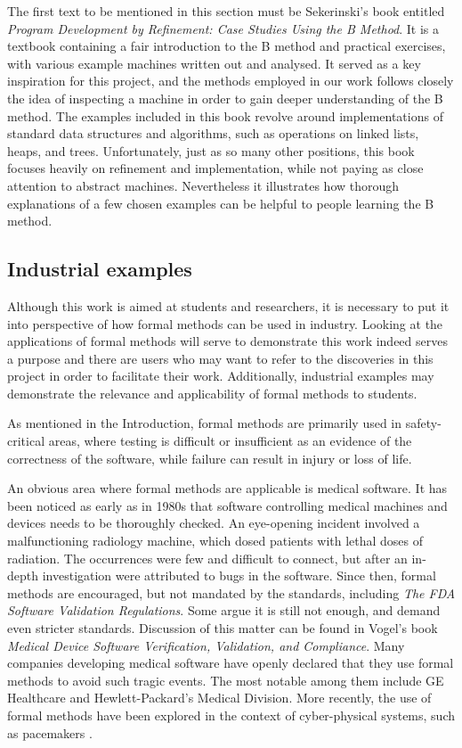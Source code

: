 \documentclass[12pt,journal,duplex]{IEEEtran}
\begin{document}
	The first text to be mentioned in this section must be Sekerinski's book entitled \emph{Program Development by Refinement: Case Studies Using the B Method}\cite{Sekerinski}. It is a textbook containing a fair introduction to the B method and practical exercises, with various example machines written out and analysed. It served as a key inspiration for this project, and the methods employed in our work follows closely the idea of inspecting a machine in order to gain deeper understanding of the B method. The examples included in this book revolve around implementations of standard data structures and algorithms, such as operations on linked lists, heaps, and trees. Unfortunately, just as so many other positions, this book focuses heavily on refinement and implementation, while not paying as close attention to abstract machines. Nevertheless it illustrates how thorough explanations of a few chosen examples can be helpful to people learning the B method.

	\subsection{Industrial examples}
	Although this work is aimed at students and researchers, it is necessary to put it into perspective of how formal methods can be used in industry. Looking at the applications of formal methods will serve to demonstrate this work indeed serves a purpose and there are users who may want to refer to the discoveries in this project in order to facilitate their work. Additionally, industrial examples may demonstrate the relevance and applicability of formal methods to students.

	As mentioned in the Introduction, formal methods are primarily used in safety-critical areas, where testing is difficult or insufficient as an evidence of the correctness of the software, while failure can result in injury or loss of life.

	An obvious area where formal methods are applicable is medical software. It has been noticed as early as in 1980s that software controlling medical machines and devices needs to be thoroughly checked. An eye-opening incident involved a malfunctioning radiology machine, which dosed patients with lethal doses of radiation. The occurrences were few and difficult to connect, but after an in-depth investigation were attributed to bugs in the software\cite{therac}. Since then, formal methods are encouraged, but not mandated by the standards, including \emph{The FDA Software Validation Regulations}\cite{FDA}. Some argue it is still not enough, and demand even stricter standards. Discussion of this matter can be found in Vogel's book \emph{Medical Device Software Verification, Validation, and Compliance}\cite{vogel}. Many companies developing medical software have openly declared that they use formal methods to avoid such tragic events. The most notable among them include GE Healthcare\cite{ge} and Hewlett-Packard's Medical Division\cite{hp}. More recently, the use of formal methods have been explored in the context of cyber-physical systems\cite{cyber_physical}, such as pacemakers \cite{pacemaker_kwiatkowska3}.
\end{document}
